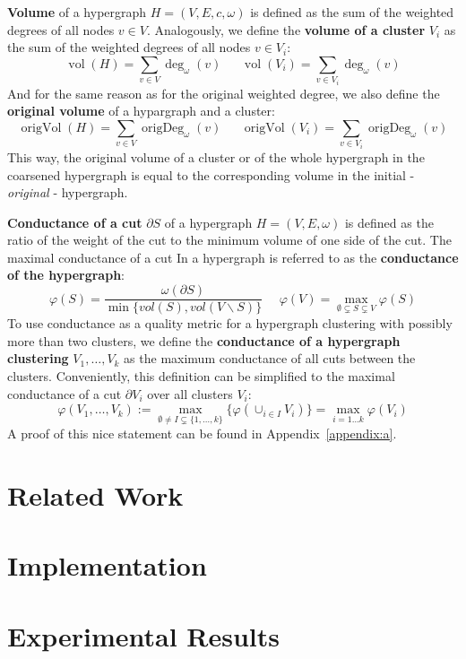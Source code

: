 \documentclass[acmsmall,nonacm,screen,review]{acmart}
\DeclareMathOperator{\vol}{vol}
\DeclareMathOperator{\origVol}{origVol}
\DeclareMathOperator{\origDeg}{origDeg}
\begin{document}
\smallbreak
\noindent\textbf{Volume} of a hypergraph $H = (V, E, c, \omega)$ is defined as the 
sum of the weighted degrees of all nodes $v \in V$. Analogously, we define the 
\textbf{volume of a cluster} $V_i$ as the sum of the weighted degrees of all 
nodes $v \in V_i$:
\[\vol(H) = \sum_{v \in V} \deg_\omega(v) \ \ \ \ \ \ \
\vol(V_i) = \sum_{v \in V_i} \deg_\omega(v)\]
And for the same reason as for the original weighted degree, we also define 
the \textbf{original volume} of a hypargraph and a cluster:
\[\origVol(H) = \sum_{v \in V} \origDeg_\omega(v) \ \ \ \ \ \ \
\origVol(V_i) = \sum_{v \in V_i} \origDeg_\omega(v)\]
This way, the original volume of a cluster or of the whole hypergraph 
in the coarsened hypergraph is equal to the corresponding volume in the initial 
- \textit{original} - hypergraph.

\smallbreak
\noindent\textbf{Conductance of a cut} $\partial S$ of a hypergraph 
$H = (V, E, \omega)$ is defined as the ratio of the weight of the cut to the 
minimum volume of one side of the cut. The maximal conductance of a cut In
a hypergraph is referred to as the \textbf{conductance of the hypergraph}:
\[{\varphi(S)} = \frac{\omega(\partial S)}{\min\{vol(S), vol(V \backslash S)\}}
\ \ \ \ \ \ 
{\varphi(V)} = \max_{\emptyset \subsetneq S \subsetneq V} \varphi(S)
\]
To use conductance as a quality metric for a hypergraph clustering with 
possibly more than two clusters, we define the 
\textbf{conductance of a hypergraph clustering} $V_1, \dots, V_k$ as the 
maximum conductance of all cuts between the clusters. Conveniently, this 
definition can be simplified to the maximal conductance of a cut $\partial V_i$ 
over all clusters $V_i$:
\[\varphi(V_1, \dots, V_k) 
:= \max_{\emptyset \neq I \subsetneq \{1, \dots, k\}} 
        \{\varphi(\cup_{i \in I} V_i)\} = \max_{i = 1 \dots k} \varphi(V_i)\]
A proof of this nice statement can be found in Appendix~\ref{appendix:a}.

\section{Related Work}
\label{sec:related_work}



\section{Implementation}
\label{sec:implementation}

\section{Experimental Results}
\label{sec:experiments}
\end{document}
